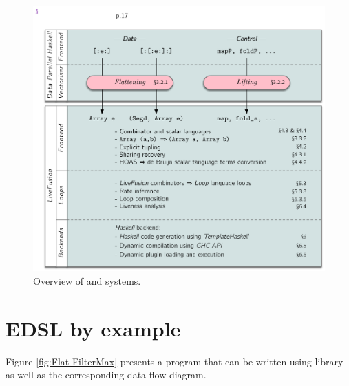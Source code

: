 \documentclass[preamble.tex]{subfiles}
\begin{document}
\begin{figure}
  \includegraphics[width=\textwidth]{img/Overview.pdf}
  \caption{Overview of \DPH and \LiveFusion systems.}
  \label{fig:Overview}
\end{figure}



\clearpage
\section{\LiveFusion EDSL by example}

Figure \ref{fig:Flat-FilterMax} presents a program that can be written using \LiveFusion library as well as the corresponding data flow diagram.
\end{document}
